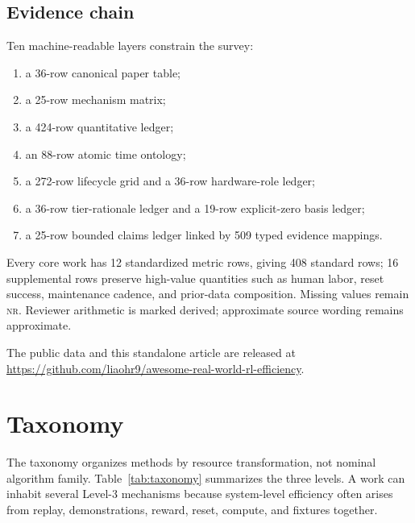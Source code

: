 \documentclass[11pt]{article}
\newcommand{\NR}{\textsc{nr}}
\begin{document}
\subsection{Evidence chain}

Ten machine-readable layers constrain the survey:
\begin{enumerate}
    \item a 36-row canonical paper table;
    \item a 25-row mechanism matrix;
    \item a 424-row quantitative ledger;
    \item an 88-row atomic time ontology;
    \item a 272-row lifecycle grid and a 36-row hardware-role ledger;
    \item a 36-row tier-rationale ledger and a 19-row explicit-zero basis ledger;
    \item a 25-row bounded claims ledger linked by 509 typed evidence mappings.
\end{enumerate}
Every core work has 12 standardized metric rows, giving 408 standard rows; 16 supplemental rows preserve high-value quantities such as human labor, reset success, maintenance cadence, and prior-data composition. Missing values remain \NR. Reviewer arithmetic is marked derived; approximate source wording remains approximate.

The public data and this standalone article are released at \url{https://github.com/liaohr9/awesome-real-world-rl-efficiency}.

\section{Taxonomy}

The taxonomy organizes methods by resource transformation, not nominal algorithm family. Table~\ref{tab:taxonomy} summarizes the three levels. A work can inhabit several Level-3 mechanisms because system-level efficiency often arises from replay, demonstrations, reward, reset, compute, and fixtures together.
\end{document}
